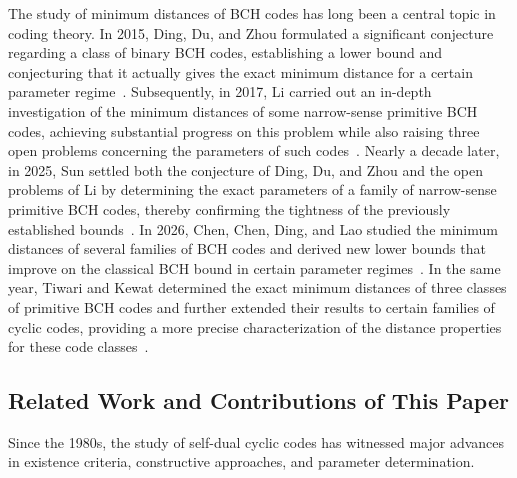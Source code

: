 \documentclass[journal,12pt,onecolumn]{IEEEtran}
\begin{document}
The study of minimum distances of BCH codes has long been a central topic in coding theory. In 2015, Ding, Du, and Zhou formulated a significant conjecture regarding a class of binary BCH codes, establishing a lower bound and conjecturing that it actually gives the exact minimum distance for a certain parameter regime~\cite{7056532}. Subsequently, in 2017, Li carried out an in-depth investigation of the minimum distances of some narrow-sense primitive BCH codes, achieving substantial progress on this problem while also raising three open problems concerning the parameters of such codes~\cite{2017The}. Nearly a decade later, in 2025, Sun settled both the conjecture of Ding, Du, and Zhou and the open problems of Li by determining the exact parameters of a family of narrow-sense primitive BCH codes, thereby confirming the tightness of the previously established bounds~\cite{Sun2025}. In 2026, Chen, Chen, Ding, and Lao studied the minimum distances of several families of BCH codes and derived new lower bounds that improve on the classical BCH bound in certain parameter regimes~\cite{11505961}. In the same year, Tiwari and Kewat determined the exact minimum distances of three classes of primitive BCH codes and further extended their results to certain families of cyclic codes, providing a more precise characterization of the distance properties for these code classes~\cite{11428251}.

\subsection{Related Work and Contributions of This Paper}
Since the 1980s, the study of self-dual cyclic codes has witnessed major advances in existence criteria, constructive approaches, and parameter determination.
\end{document}
